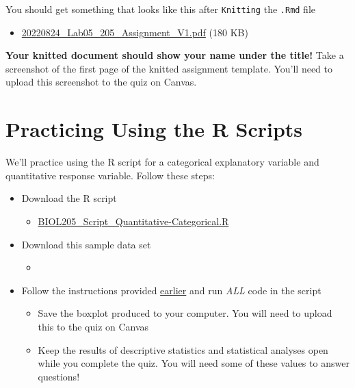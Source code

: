 \documentclass[
]{book}
\providecommand{\tightlist}{%
  \setlength{\itemsep}{0pt}\setlength{\parskip}{0pt}}
\begin{document}
You should get something that looks like this after \texttt{Knitting} the \texttt{.Rmd} file

\begin{itemize}
\tightlist
\item
  \href{https://osf.io/download/3k8ve}{20220824\_Lab05\_205\_Assignment\_V1.pdf} (180 KB)
\end{itemize}

\textbf{Your knitted document should show your name under the title!} Take a screenshot of the first page of the knitted assignment template. You'll need to upload this screenshot to the quiz on Canvas.

\hypertarget{practicing-using-the-r-scripts}{%
\section*{Practicing Using the R Scripts}\label{practicing-using-the-r-scripts}}

We'll practice using the R script for a categorical explanatory variable and quantitative response variable. Follow these steps:

\begin{itemize}
\tightlist
\item
  Download the R script

  \begin{itemize}
  \tightlist
  \item
    \href{https://osf.io/download/46mpk}{BIOL205\_Script\_Quantitative-Categorical.R}
  \end{itemize}
\item
  Download this sample data set

  \begin{itemize}
  \tightlist
  \item
  \end{itemize}
\item
  Follow the instructions provided \href{}{earlier} and run \emph{ALL} code in the script

  \begin{itemize}
  \tightlist
  \item
    Save the boxplot produced to your computer. You will need to upload this to the quiz on Canvas
  \item
    Keep the results of descriptive statistics and statistical analyses open while you complete the quiz. You will need some of these values to answer questions!
  \end{itemize}
\end{itemize}
\end{document}
